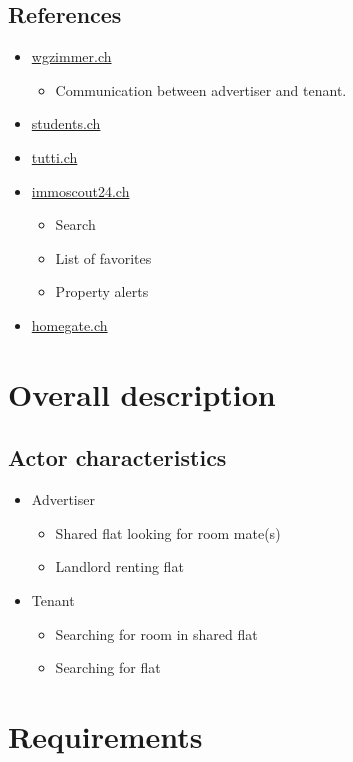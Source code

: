 \documentclass[a4paper,11pt]{article}
\begin{document}
\subsection*{References}
\begin{itemize}
  \item \href{www.wgzimmer.ch}{wgzimmer.ch}
  \begin{itemize}
    \item Communication between advertiser and tenant.
  \end{itemize}
  \item \href{http://www.students.ch/wohnen}{students.ch}
  \item \href{http://www.tutti.ch/ganze-schweiz/immobilien/wg-zimmer}{tutti.ch}
  \item \href{http://www.immoscout24.ch/}{immoscout24.ch}
  \begin{itemize}
    \item Search
    \item List of favorites
    \item Property alerts
  \end{itemize}
  \item \href{http://www.homegate.ch/}{homegate.ch}
\end{itemize}

\section{Overall description}
\subsection*{Actor characteristics}
\begin{itemize}
  \item Advertiser
    \begin{itemize}
      \item Shared flat looking for room mate(s)
      \item Landlord renting flat
    \end{itemize}
  \item Tenant
  \begin{itemize}
    \item Searching for room in shared flat
    \item Searching for flat
  \end{itemize}
\end{itemize}

\section{Requirements}
\end{document}
